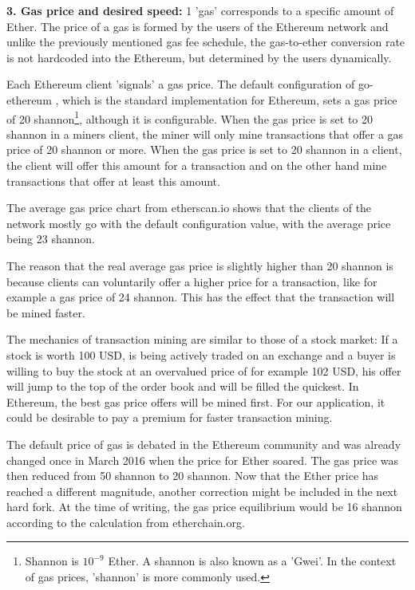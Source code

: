 \par
\textbf{3. Gas price and desired speed:} 1 'gas' corresponds to a specific amount of Ether. The price of a gas is formed by the users of the Ethereum network and unlike the previously mentioned gas fee schedule, the gas-to-ether conversion rate is not hardcoded into the Ethereum, but determined by the users dynamically.

Each Ethereum client 'signals' a gas price. The default configuration of go-ethereum \cite{DefaultGoEthereumConfiguration}, which is the standard implementation for Ethereum, sets a gas price of 20 shannon\footnote{ Shannon is $10^{-9}$ Ether. A shannon is also known as a 'Gwei'. In the context of gas prices, 'shannon' is more commonly used.}, although it is configurable. When the gas price is set to 20 shannon in a miners client, the miner will only mine transactions that offer a gas price of 20 shannon or more. When the gas price is set to 20 shannon in a client, the client will offer this amount for a transaction and on the other hand mine transactions that offer at least this amount.

The average gas price chart from etherscan.io \cite{AverageGasPrice} shows that the clients of the network mostly go with the default configuration value, with the average price being 23 shannon.

The reason that the real average gas price is slightly higher than 20 shannon is because clients can voluntarily offer a higher price for a transaction, like for example a gas price of 24 shannon. This has the effect that the transaction will be mined faster.

The mechanics of transaction mining are similar to those of a stock market: If a stock is worth 100 USD, is being actively traded on an exchange and a buyer is willing to buy the stock at an overvalued price of for example 102 USD, his offer will jump to the top of the order book and will be filled the quickest. In Ethereum, the best gas price offers will be mined first. For our application, it could be desirable to pay a premium for faster transaction mining.

The default price of gas is debated in the Ethereum community and was already changed once in March 2016 when the price for Ether soared. The gas price was then reduced from 50 shannon to 20 shannon. Now that the Ether price has reached a different magnitude, another correction might be included in the next hard fork. At the time of writing, the gas price equilibrium would be 16 shannon according to the calculation from etherchain.org.

